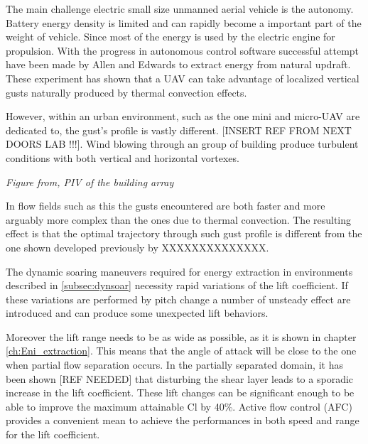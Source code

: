 
 \label{subsec:dynsoar}

\par The main challenge electric small size unmanned aerial vehicle is the autonomy.
Battery energy density is limited and can rapidly become a important part of the weight of vehicle.
Since most of the energy is used by the electric engine for propulsion. 
With the progress in autonomous control software successful attempt have been made by Allen \cite{flight_test_soaring_NASA} and Edwards \cite{flight_test_soaring_NCU} to extract energy from natural updraft.
These experiment has shown that a UAV can take advantage of localized vertical gusts naturally produced by thermal convection effects.

\par However, within an urban environment, such as the one mini and micro-UAV are dedicated to, the gust's profile is vastly different. [INSERT REF FROM NEXT DOORS LAB !!!]. 
Wind blowing through an group of building produce turbulent conditions with both vertical and horizontal vortexes.

\par \emph{Figure from, PIV of the building array}

\par In flow fields such as this the gusts encountered are both faster and more arguably more complex than the ones due to thermal convection.
The resulting effect is that the optimal trajectory through such gust profile is different from the one shown developed previously by XXXXXXXXXXXXXX.
 

\par The dynamic soaring maneuvers required for energy extraction in environments described in \ref{subsec:dynsoar} necessity rapid variations of the lift coefficient. If these variations are performed by pitch change a number of unsteady effect are introduced and can produce some unexpected lift behaviors.

\par Moreover the lift range needs to be as wide as possible, as it is shown in chapter \ref{ch:Eni_extraction}.
This means that the angle of attack will be close to the one when partial flow separation occurs.
In the partially separated domain, it has been shown [REF NEEDED] that disturbing the shear layer leads to a sporadic increase in the lift coefficient.
These lift changes can be significant enough to be able to improve the maximum attainable Cl by 40\%.
Active flow control (AFC) provides a convenient mean to achieve the performances in both speed and range for the lift coefficient. 

